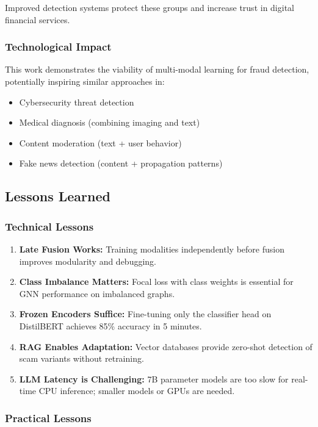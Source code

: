 Improved detection systems protect these groups and increase trust in digital financial services.

\subsubsection{Technological Impact}

This work demonstrates the viability of multi-modal learning for fraud detection, potentially inspiring similar approaches in:
\begin{itemize}
    \item Cybersecurity threat detection
    \item Medical diagnosis (combining imaging and text)
    \item Content moderation (text + user behavior)
    \item Fake news detection (content + propagation patterns)
\end{itemize}

\subsection{Lessons Learned}

\subsubsection{Technical Lessons}

\begin{enumerate}
    \item \textbf{Late Fusion Works:} Training modalities independently before fusion improves modularity and debugging.
    \item \textbf{Class Imbalance Matters:} Focal loss with class weights is essential for GNN performance on imbalanced graphs.
    \item \textbf{Frozen Encoders Suffice:} Fine-tuning only the classifier head on DistilBERT achieves 85\% accuracy in 5 minutes.
    \item \textbf{RAG Enables Adaptation:} Vector databases provide zero-shot detection of scam variants without retraining.
    \item \textbf{LLM Latency is Challenging:} 7B parameter models are too slow for real-time CPU inference; smaller models or GPUs are needed.
\end{enumerate}

\subsubsection{Practical Lessons}

